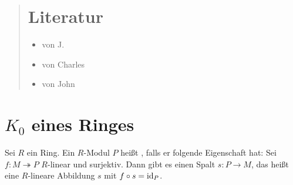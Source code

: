 
\newcommand{\fach}{Algebraische $K$-Theorie}
\newcommand{\semester}{Sose 2016}
\newcommand{\homepage}{https://wwwmath.uni-muenster.de/reine/u/topos/lehre/WS2015-2016/Topologie2/}

\newcommand{\prof}{Prof.\ Dr.\ Arthur Bartels}
\publishers{}



\maketitle
\begin{abstract}

\section*{Literatur}
\begin{itemize}
	\item {} von J. \textsc{\citeauthor{Rosenberg}} \cite{Rosenberg}
	\item {} von Charles \textsc{\citeauthor{Weibel}} \cite{Weibel}
	\item {} von John \textsc{\citeauthor{MilnorKtheory}} \cite{MilnorKtheory}
\end{itemize}
\end{abstract}

\tableofcontents
\cleardoubleoddemptypage

\setcounter{page}{1}
\setcounter{footnote}{0}

\section{$K_0$ eines Ringes} %
\label{sec:1}

\begin{definition}[{name=[{projektiv}]}]
	Sei $R$ ein Ring.
	Ein $R$-Modul $P$ heißt , falls er folgende Eigenschaft hat:
	Sei $f \colon M \twoheadrightarrow P$ $R$-linear und surjektiv. 
	Dann gibt es einen Spalt $s \colon P \to M$, das heißt eine $R$-lineare Abbildung $s$ mit $f \circ s = \operatorname{id}_P$.
\end{definition}


